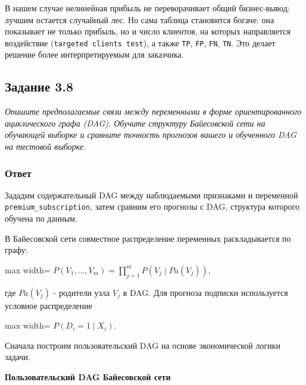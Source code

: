 \documentclass[11pt]{article}
\newenvironment{tasktext}
      {\begin{tcolorbox}[breakable, colback=black!3, colframe=black!28,
        boxrule=0.4pt, arc=1.5mm, left=7pt, right=7pt, top=5pt, bottom=5pt,
        before skip=0.35em, after skip=0.75em]\itshape}
      {\end{tcolorbox}}
\begin{document}
В нашем случае нелинейная прибыль не переворачивает общий бизнес-вывод:
лучшим остается случайный лес. Но сама таблица становится богаче: она
показывает не только прибыль, но и число клиентов, на которых
направляется воздействие (\texttt{targeted\ clients\ test}), а также
\texttt{TP}, \texttt{FP}, \texttt{FN}, \texttt{TN}. Это делает решение
более интерпретируемым для заказчика.

    \subsection{Задание 3.8}\label{ux437ux430ux434ux430ux43dux438ux435-3.8}

\begin{tasktext}
Опишите предполагаемые связи между переменными в форме ориентированного
ациклического графа (DAG). Обучите структуру Байесовской сети на
обучающей выборке и сравните точность прогнозов вашего и обученного DAG
на тестовой выборке.
\end{tasktext}

\subsubsection{Ответ}

Зададим содержательный DAG между наблюдаемыми признаками и переменной
\texttt{premium\_subscription}, затем сравним его прогнозы с DAG,
структура которого обучена по данным.

В Байесовской сети совместное распределение переменных раскладывается по
графу:

\begin{center}
\begin{adjustbox}{max width=\linewidth}
\(\displaystyle P(V_1, \ldots, V_m) = \prod_{j=1}^{m} P(V_j \mid Pa(V_j)),\)
\end{adjustbox}
\end{center}

где \(Pa(V_j)\) - родители узла \(V_j\) в DAG. Для прогноза подписки
используется условное распределение

\begin{center}
\begin{adjustbox}{max width=\linewidth}
\(\displaystyle P(D_i = 1 \mid X_i).\)
\end{adjustbox}
\end{center}

    Сначала построим пользовательский DAG на основе экономической логики
задачи.

    \textbf{Пользовательский DAG Байесовской сети}
\end{document}
